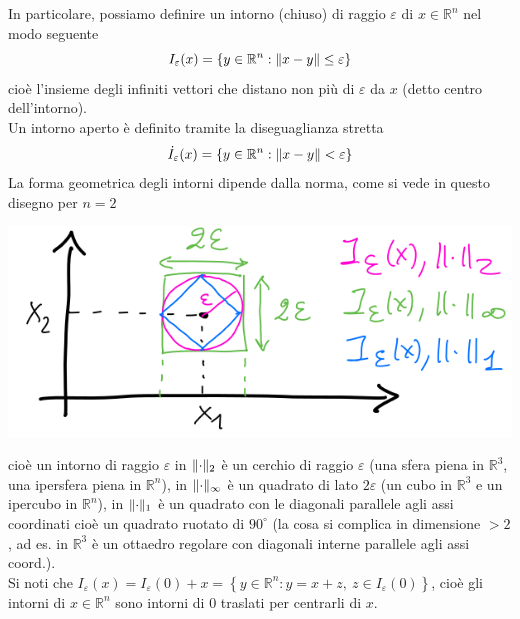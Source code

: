 \documentclass[12pt,a4paper]{article}
\DeclarePairedDelimiter{\norma}{\lVert}{\rVert}
\begin{document}
In particolare, possiamo definire un intorno (chiuso) di raggio $\varepsilon$ di $x \in \mathbb{R}^n$ nel modo seguente
\begin{equation*}
    I_\varepsilon(x)=\left\{ y \in \mathbb{R}^n : \norma{x-y} \leq \varepsilon \right\}
\end{equation*}
cioè l'insieme degli infiniti vettori che distano non più di $\varepsilon$ da $x$ (detto centro dell'intorno). \\
Un intorno aperto è definito tramite la diseguaglianza stretta 
\begin{equation*}
    \Dot{I}_\varepsilon (x) = \left\{ y \in \mathbb{R}^n : \norma{x-y}<\varepsilon \right\}
\end{equation*}
La forma geometrica degli intorni dipende dalla norma, come si vede in questo disegno per $n=2$
\begin{center}
    \includegraphics[scale=0.5]{pag14.png}    
\end{center}
cioè un intorno di raggio $\varepsilon$ in $\norma{\cdot}_2$ è un cerchio di raggio $\varepsilon$ (una sfera piena in $\mathbb{R}^3$, una ipersfera piena in $\mathbb{R}^n$), in $\norma{\cdot}_\infty$ è un quadrato di lato $2\varepsilon$ (un cubo in $\mathbb{R}^3$ e un ipercubo in $\mathbb{R}^n$), in $\norma{\cdot}_1$ è un quadrato con le diagonali parallele agli assi coordinati cioè un quadrato ruotato di $90^\circ$ (la cosa si complica in dimensione $>2$, ad es. in $\mathbb{R}^3$ è un ottaedro regolare con diagonali interne parallele agli assi coord.). \\
Si noti che $I_\varepsilon(x) = I_\varepsilon(0) + x = \left\{ y \in \mathbb{R}^n : y = x+z, \ z \in I_\varepsilon(0) \right\}$,
cioè gli intorni di $x \in \mathbb{R}^n$ sono intorni di 0 traslati per centrarli di $x$.\\
\end{document}
